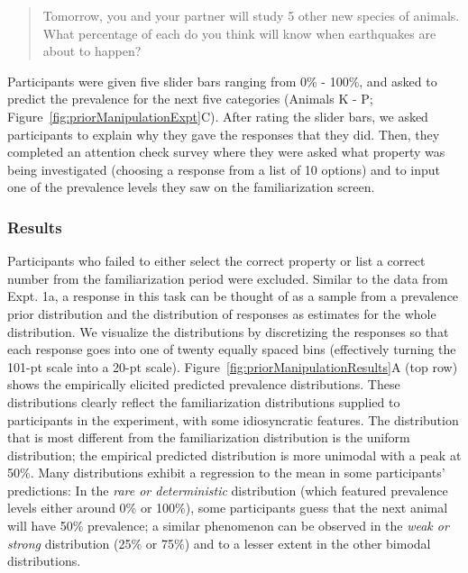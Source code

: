 \documentclass[floatsintext,doc]{apa6}
\begin{document}
\begin{quote}
Tomorrow, you and your partner will study 5 other new species of animals. What percentage of each do you think will know when earthquakes are about to happen?
\end{quote}

Participants were given five slider bars ranging from 0\% - 100\%, and asked to predict the prevalence for the next five categories (Animals K - P; Figure~\ref{fig:priorManipulationExpt}C).
After rating the slider bars, we asked participants to explain why they gave the responses that they did.
Then, they completed an attention check survey where they were asked what property was being investigated (choosing a response from a list of 10 options) and to input one of the prevalence levels they saw on the familiarization screen.

\hypertarget{results-1}{%
\subsubsection{Results}\label{results-1}}

Participants who failed to either select the correct property or list a correct number from the familiarization period were excluded.
Similar to the data from Expt. 1a, a response in this task can be thought of as a sample from a prevalence prior distribution and the distribution of responses as estimates for the whole distribution.
We visualize the distributions by discretizing the responses so that each response goes into one of twenty equally spaced bins (effectively turning the 101-pt scale into a 20-pt scale).
Figure~\ref{fig:priorManipulationResults}A (top row) shows the empirically elicited predicted prevalence distributions.
These distributions clearly reflect the familiarization distributions supplied to participants in the experiment, with some idiosyncratic features.
The distribution that is most different from the familiarization distribution is the uniform distribution; the empirical predicted distribution is more unimodal with a peak at 50\%.
Many distributions exhibit a regression to the mean in some participants' predictions: In the \emph{rare or deterministic} distribution (which featured prevalence levels either around 0\% or 100\%), some participants guess that the next animal will have 50\% prevalence; a similar phenomenon can be observed in the \emph{weak or strong} distribution (25\% or 75\%) and to a lesser extent in the other bimodal distributions.
\end{document}
